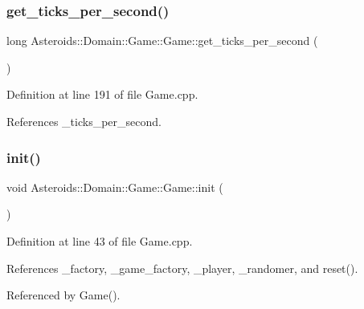 \subsubsection{\texorpdfstring{get\+\_\+ticks\+\_\+per\+\_\+second()}{get\_ticks\_per\_second()}}
{\footnotesize\ttfamily long Asteroids\+::\+Domain\+::\+Game\+::\+Game\+::get\+\_\+ticks\+\_\+per\+\_\+second (\begin{DoxyParamCaption}{ }\end{DoxyParamCaption})}



Definition at line 191 of file Game.\+cpp.



References \+\_\+ticks\+\_\+per\+\_\+second.

\mbox{\label{classAsteroids_1_1Domain_1_1Game_1_1Game_a83299855cbf877f34f84b974fc35f8bb}} 
\subsubsection{\texorpdfstring{init()}{init()}}
{\footnotesize\ttfamily void Asteroids\+::\+Domain\+::\+Game\+::\+Game\+::init (\begin{DoxyParamCaption}{ }\end{DoxyParamCaption})\hspace{0.3cm}{\ttfamily [private]}}



Definition at line 43 of file Game.\+cpp.



References \+\_\+factory, \+\_\+game\+\_\+factory, \+\_\+player, \+\_\+randomer, and reset().



Referenced by Game().

